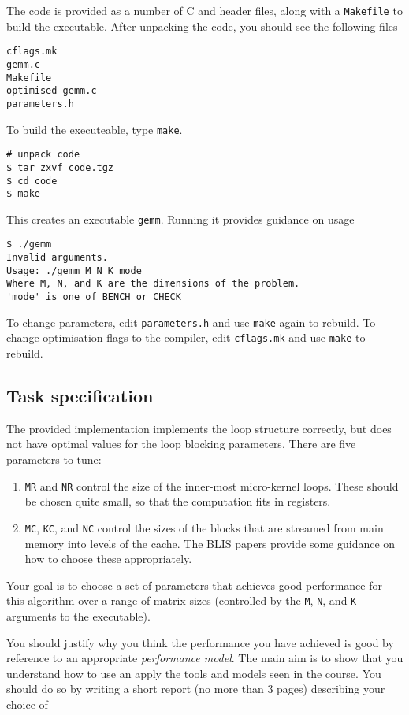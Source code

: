 \documentclass[a4paper]{article}
\begin{document}
The code is provided as a number of C and header files, along with a
\texttt{Makefile} to build the executable. After unpacking the code,
you should see the following files
\begin{verbatim}
cflags.mk
gemm.c
Makefile
optimised-gemm.c
parameters.h
\end{verbatim}

To build the executeable, type \texttt{make}.
\begin{verbatim}
# unpack code
$ tar zxvf code.tgz
$ cd code
$ make
\end{verbatim}
This creates an executable \texttt{gemm}. Running it provides guidance
on usage
\begin{verbatim}
$ ./gemm
Invalid arguments.
Usage: ./gemm M N K mode
Where M, N, and K are the dimensions of the problem.
'mode' is one of BENCH or CHECK
\end{verbatim}

To change parameters, edit \texttt{parameters.h} and use
\texttt{make} again to rebuild. To change optimisation flags to the
compiler, edit \texttt{cflags.mk} and use \texttt{make} to rebuild.

\subsection{Task specification}
\label{sec:task}
The provided implementation implements the loop structure correctly, but
does not have optimal values for the loop blocking parameters.
There are five parameters to tune:

\begin{enumerate}
\item \texttt{MR} and \texttt{NR} control the size of the inner-most
  micro-kernel loops. These should be chosen quite small, so that the
  computation fits in registers.
\item \texttt{MC}, \texttt{KC}, and \texttt{NC} control the sizes of
  the blocks that are streamed from main memory into levels of the
  cache. The BLIS papers provide some guidance on how to choose these
  appropriately.
\end{enumerate}

Your goal is to choose a set of parameters that achieves good
performance for this algorithm over a range of matrix sizes
(controlled by the \texttt{M}, \texttt{N}, and \texttt{K} arguments to
the executable).

You should justify why you think the performance you have achieved is
good by reference to an appropriate \emph{performance model}. The main
aim is to show that you understand how to use an apply the tools and
models seen in the course. You should do so by writing a short report
(no more than 3 pages) describing your choice of 
\end{document}
